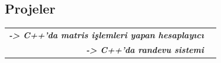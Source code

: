 \documentclass[lighthipster]{simplehipstercv}
\begin{document}
\begin{paracol}{2}
\begin{minipage}[t]{0.3\textwidth}
\section*{Projeler}
\begin{tabular}{>{\footnotesize\bfseries}r >{\footnotesize}p{}}
     \emph{-> C++'da matris işlemleri yapan hesaplayıcı} \\
     \emph{-> C++'da randevu sistemi}
\end{tabular}
\end{minipage}






\vfill{} %




\end{paracol}
\end{document}

